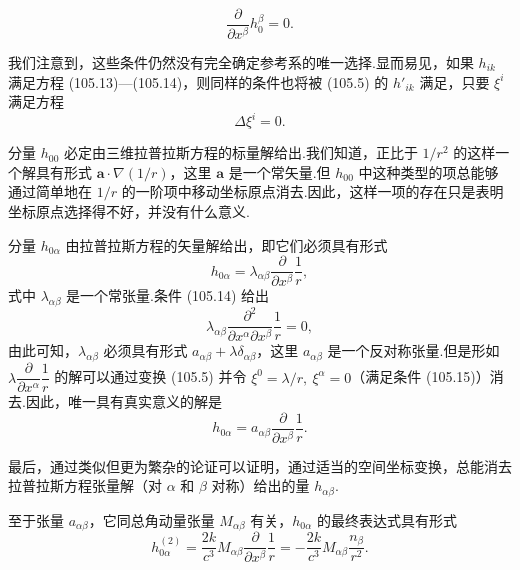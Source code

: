 \begin{equation}
  \frac{\partial}{\partial x^{\beta}}h_0^{\beta}=0.
\end{equation}

我们注意到，这些条件仍然没有完全确定参考系的唯一选择.显而易见，如果 $h_{ik}$ 满足方程 (105.13)—(105.14)，则同样的条件也将被 (105.5) 的 $h'_{ik}$ 满足，只要 $\xi^i$ 满足方程
\begin{equation}
  \Delta\xi^i=0.
\end{equation}

分量 $h_{00}$ 必定由三维拉普拉斯方程的标量解给出.我们知道，正比于 $1/r^{2}$ 的这样一个解具有形式 $\boldsymbol{a}\cdot\nabla(1/r)$，这里 $\boldsymbol{a}$ 是一个常矢量.但 $h_{00}$ 中这种类型的项总能够通过简单地在 $1/r$ 的一阶项中移动坐标原点消去.因此，这样一项的存在只是表明坐标原点选择得不好，并没有什么意义.

分量 $h_{0\alpha}$ 由拉普拉斯方程的矢量解给出，即它们必须具有形式
\begin{equation*}
  h_{0\alpha}=\lambda_{\alpha\beta}
  \frac{\partial}{\partial x^{\beta}}\frac{1}{r},
\end{equation*}
式中 $\lambda_{\alpha\beta}$ 是一个常张量.条件 (105.14) 给出
\begin{equation*}
  \lambda_{\alpha\beta}
  \frac{\partial^{2}}{\partial x^{\alpha}\partial x^{\beta}}
  \frac{1}{r}=0,
\end{equation*}
由此可知，$\lambda_{\alpha\beta}$ 必须具有形式 $a_{\alpha\beta}+\lambda\delta_{\alpha\beta}$，这里 $a_{\alpha\beta}$ 是一个反对称张量.但是形如 $\lambda\dfrac{\partial}{\partial x^{\alpha}}\dfrac{1}{r}$ 的解可以通过变换 (105.5) 并令 $\xi^0=\lambda/r,\ \xi^{\alpha}=0$（满足条件 (105.15)）消去.因此，唯一具有真实意义的解是
\begin{equation*}
  h_{0\alpha}=a_{\alpha\beta}
  \frac{\partial}{\partial x^{\beta}}\frac{1}{r}.
\end{equation*}

最后，通过类似但更为繁杂的论证可以证明，通过适当的空间坐标变换，总能消去拉普拉斯方程张量解（对 $\alpha$ 和 $\beta$ 对称）给出的量 $h_{\alpha\beta}$.

至于张量 $a_{\alpha\beta}$，它同总角动量张量 $M_{\alpha\beta}$ 有关，$h_{0\alpha}$ 的最终表达式具有形式
\begin{equation}
  h_{0\alpha}^{(2)}
  =\frac{2k}{c^{3}}M_{\alpha\beta}
  \frac{\partial}{\partial x^{\beta}}\frac{1}{r}
  =-\frac{2k}{c^{3}}M_{\alpha\beta}\frac{n_{\beta}}{r^{2}}.
\end{equation}

